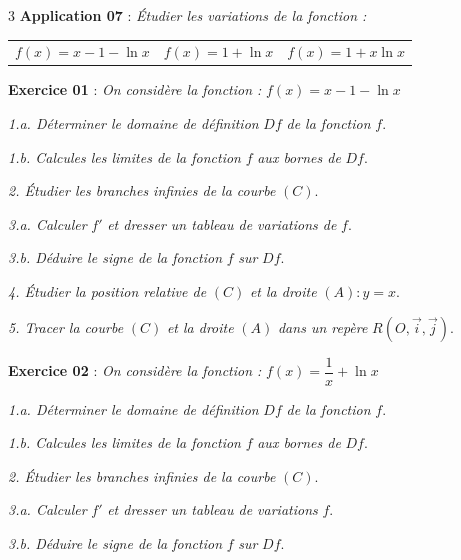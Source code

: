 \documentclass[a4paper,landscape]{article}
\renewcommand{\small}{\fontsize{6}{7}\selectfont}
\begin{document}
\begin{multicols}{3}
\noindent\colorbox{jaune}{\textbf{Application 07}} : \textit{Étudier les variations de la fonction :}
\vspace{2mm}

\begin{minipage}{\columnwidth}
\centering
\small
\begin{tabular}{@{}p{}p{}p{}@{}}
$f(x) = x - 1 - \ln x$ &
$f(x) = 1 + \ln x$ &
$f(x) = 1 + x \ln x$
\end{tabular}
\end{minipage}
\vspace{8mm}

\noindent\colorbox{vert}{\textbf{Exercice 01}} : \textit{On considère la fonction :} $f(x) = x - 1 - \ln x$

\vspace{1mm}

\textit{1.a. Déterminer le domaine de définition} $Df$ \textit{de la fonction} $f$.

\textit{1.b. Calcules les limites de la fonction} $f$ \textit{aux bornes de} $Df$.

\textit{2. Étudier les branches infinies de la courbe} $(C)$.

\textit{3.a. Calculer} $f'$ \textit{et dresser un tableau de variations de} $f$.

\textit{3.b. Déduire le signe de la fonction} $f$ \textit{sur} $Df$.

\textit{4. Étudier la position relative de} $(C)$ \textit{et la droite} $(A) : y = x$.

\textit{5. Tracer la courbe} $(C)$ \textit{et la droite} $(A)$ \textit{dans un repère} $R(O,\vec{i},\vec{j})$.

\vspace{2mm}
\noindent\colorbox{vert}{\textbf{Exercice 02}} : \textit{On considère la fonction :} $f(x) = \dfrac{1}{x} + \ln x$

\vspace{1mm}

\textit{1.a. Déterminer le domaine de définition} $Df$ \textit{de la fonction} $f$.

\textit{1.b. Calcules les limites de la fonction} $f$ \textit{aux bornes de} $Df$.

\textit{2. Étudier les branches infinies de la courbe} $(C)$.

\textit{3.a. Calculer} $f'$ \textit{et dresser un tableau de variations} $f$.

\textit{3.b. Déduire le signe de la fonction} $f$ \textit{sur} $Df$.


\end{multicols}
\end{document}
